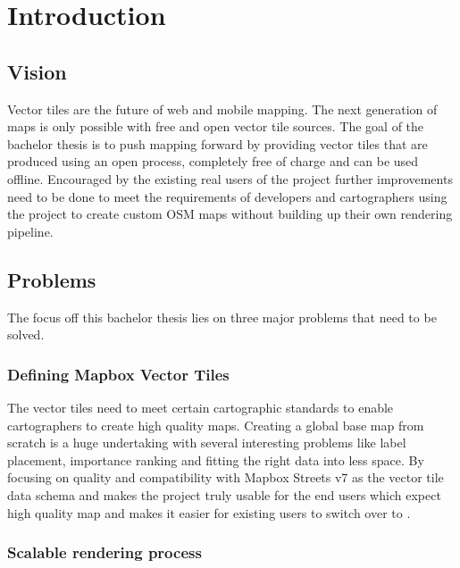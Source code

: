 \chapter{Introduction}




\section{Vision}\label{part1_vision}

Vector tiles are the future of web and mobile mapping. The next generation of maps is only possible
with free and open vector tile sources. The goal of the bachelor thesis is to push mapping forward by providing
vector tiles that are produced using an open process, completely free of charge and can be used offline.
Encouraged by the existing real users of the project further improvements need to be done to meet the requirements of developers and cartographers using the project to create custom OSM maps without building up their own rendering pipeline.


\section{Problems}\label{goals}

The focus off this bachelor thesis lies on three major problems that need to be solved.

\subsection{Defining Mapbox Vector Tiles}\label{intro_carto_standards}

The vector tiles need to meet certain cartographic standards to enable cartographers to create high quality maps. Creating a global base map from scratch is a huge undertaking with several interesting problems like label placement, importance ranking and fitting the right data into less space. By focusing on quality and compatibility with Mapbox Streets v7 as the vector tile data schema and makes the project truly usable for the end users which expect high quality map and makes it easier for existing users to switch over to \osmvt{}.

\subsection{Scalable rendering process}\label{scalable-rendering-process}

